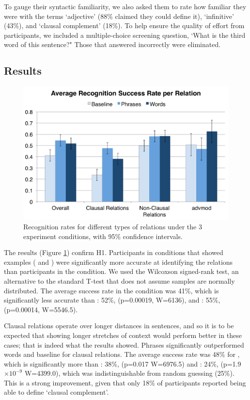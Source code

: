  To gauge their syntactic familiarity, we also asked them to rate how familiar they were with the terms `adjective' (88\% claimed they could define it), `infinitive' (43\%), and `clausal complement' (18\%). To help ensure the quality of effort from participants, we included a multiple-choice screening question, `What is the third word of this sentence?"  Those that answered incorrectly were eliminated.

\subsection{Results}
\begin{figure}
\centering
\includegraphics[width=\columnwidth]{fig/results}
\caption{\label{fig:results} Recognition rates for different types of relations under the 3 experiment conditions, with 95\% confidence intervals.}
\end{figure}

The results (Figure \ref{fig:results}) confirm H1. Participants in conditions that showed examples ( and ) were significantly more accurate at identifying the relations than participants in the  condition. We used the Wilcoxson signed-rank test, an alternative to the standard T-test that does not assume samples are normally distributed. The average success rate in the  condition was 41\%, which is significantly less accurate than : 52\%, (p=0.00019, W=6136), and : 55\%, (p=0.00014, W=5546.5).


Clausal relations operate over longer distances in sentences, and so it is to be expected that showing longer stretches of context would perform better in these cases; that is indeed what the results showed.
Phrases significantly outperformed words and baseline for clausal relations. The average success rate was 48\% for , which is significantly more than : 38\%, (p=0.017 W=6976.5) and : 24\%, (p=1.9$\times 10^{-9}$ W=4399.0), which was indistinguishable from random guessing (25\%). This is a  strong improvement, given that only 18\% of participants reported being able to define  `clausal complement'.

